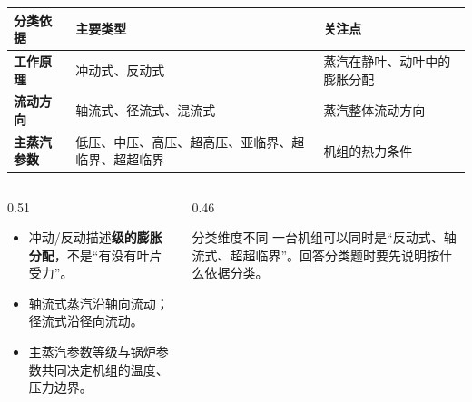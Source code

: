 \begin{frame}[t,shrink]{}
\begin{smalltab}
\begin{tabularx}{\linewidth}{@{}>{\bfseries}p{24mm}p{45mm}X@{}}
  \toprule
  分类依据 & 主要类型 & 关注点\\
  \midrule
  工作原理 & 冲动式、反动式 & 蒸汽在静叶、动叶中的膨胀分配\\
  流动方向 & 轴流式、径流式、混流式 & 蒸汽整体流动方向\\
  主蒸汽参数 & 低压、中压、高压、超高压、亚临界、超临界、超超临界 & 机组的热力条件\\
  \bottomrule
\end{tabularx}
\end{smalltab}
\begin{columns}[T,onlytextwidth]
\begin{column}{0.51\textwidth}
  \begin{itemize}
    \item 冲动/反动描述\textbf{级的膨胀分配}，不是“有没有叶片受力”。
    \item 轴流式蒸汽沿轴向流动；径流式沿径向流动。
    \item 主蒸汽参数等级与锅炉参数共同决定机组的温度、压力边界。
  \end{itemize}
\end{column}
\begin{column}{0.46\textwidth}
  \begin{keybox}{分类维度不同}
  \small 一台机组可以同时是“反动式、轴流式、超超临界”。回答分类题时要先说明按什么依据分类。
  \end{keybox}
\end{column}
\end{columns}
\end{frame}

